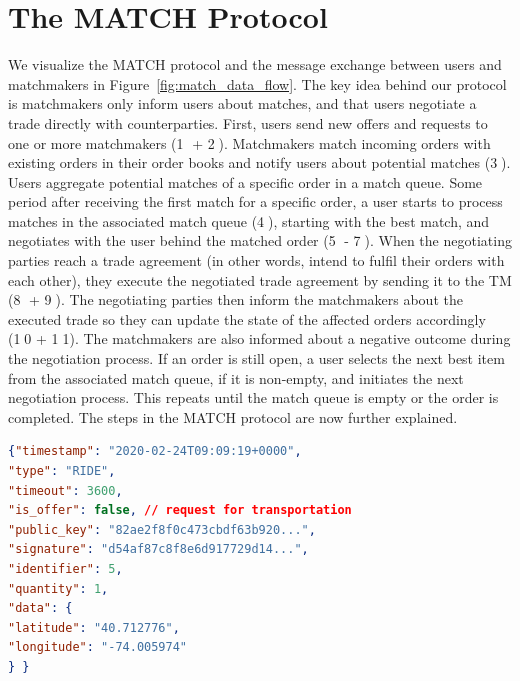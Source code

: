 \section{The MATCH Protocol}
\label{sec:protocol}
We visualize the MATCH protocol and the message exchange between users and matchmakers in Figure~\ref{fig:match_data_flow}.
The key idea behind our protocol is matchmakers only inform users about matches, and that users negotiate a trade directly with counterparties.
First, users send new offers and requests to one or more matchmakers (\textcircled{1} + \textcircled{2}).
Matchmakers match incoming orders with existing orders in their order books and notify users about potential matches (\textcircled{3}).
Users aggregate potential matches of a specific order in a match queue.
Some period after receiving the first match for a specific order, a user starts to process matches in the associated match queue (\textcircled{4}), starting with the best match, and negotiates with the user behind the matched order (\textcircled{5} - \textcircled{7}).
When the negotiating parties reach a trade agreement (in other words, intend to fulfil their orders with each other), they execute the negotiated trade agreement by sending it to the TM (\textcircled{8} + \textcircled{9}).
The negotiating parties then inform the matchmakers about the executed trade so they can update the state of the affected orders accordingly (\textcircled{10} + \textcircled{11}).
The matchmakers are also informed about a negative outcome during the negotiation process.
If an order is still open, a user selects the next best item from the associated match queue, if it is non-empty, and initiates the next negotiation process.
This repeats until the match queue is empty or the order is completed.
The steps in the MATCH protocol are now further explained.

\begin{lstlisting}[language=json,firstnumber=1,float=b,caption=An order in a ride-hailing market (in JSON format).,label=lst:order_example]
{"timestamp": "2020-02-24T09:09:19+0000",
"type": "RIDE",
"timeout": 3600,
"is_offer": false, // request for transportation
"public_key": "82ae2f8f0c473cbdf63b920...",
"signature": "d54af87c8f8e6d917729d14...",
"identifier": 5,
"quantity": 1,
"data": {
"latitude": "40.712776",
"longitude": "-74.005974"
} }
\end{lstlisting}

